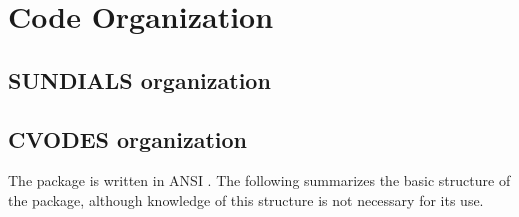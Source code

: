 \chapter{Code Organization}\label{s:organization}

\section{SUNDIALS organization}\label{ss:sun_org}


\section{CVODES organization}\label{ss:cvodes_org}

The {\cvodes} package is written in ANSI {\CC}. The following
summarizes the basic structure of the package, although knowledge
of this structure is not necessary for its use.

